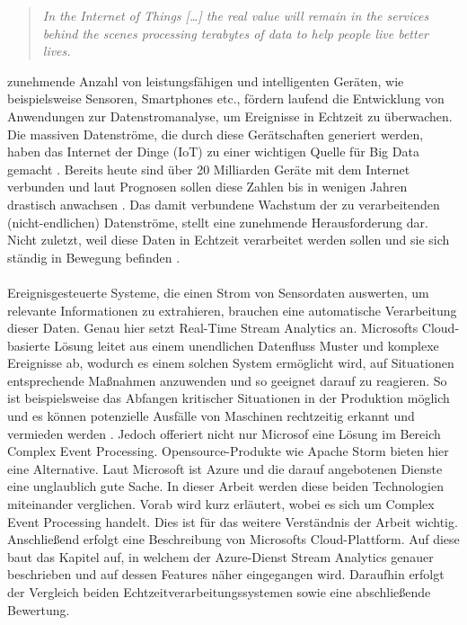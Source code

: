 
\begin{quote} \textit{\glqq In the Internet of Things […] the real value will remain in the services behind the scenes processing terabytes of data to help people live better lives. \grqq~}\cite{Floarea.2014}\\ \end{quote} 

 zunehmende Anzahl von leistungsfähigen und intelligenten Geräten, wie beispielsweise Sensoren, Smartphones etc., fördern laufend die Entwicklung von Anwendungen zur Datenstromanalyse, um Ereignisse in Echtzeit zu überwachen. Die massiven Datenströme, die durch diese Gerätschaften generiert werden, haben das Internet der Dinge (IoT) zu einer wichtigen Quelle für Big Data gemacht \cite{Prosise.}. Bereits heute sind über 20 Milliarden Geräte mit dem Internet verbunden und laut Prognosen sollen diese Zahlen bis in wenigen Jahren drastisch anwachsen \cite{Statista.2017}. Das damit verbundene Wachstum der zu verarbeitenden (nicht-endlichen) Datenströme, stellt eine zunehmende Herausforderung dar. Nicht zuletzt, weil diese Daten in Echtzeit verarbeitet werden sollen und sie sich ständig in Bewegung befinden \cite{Prosise.}.\\ \\ Ereignisgesteuerte Systeme, die einen Strom von Sensordaten auswerten, um relevante Informationen zu extrahieren, brauchen eine automatische Verarbeitung dieser Daten. Genau hier setzt Real-Time Stream Analytics an. Microsofts Cloud-basierte Lösung leitet aus einem unendlichen Datenfluss Muster und komplexe Ereignisse ab, wodurch es einem solchen System ermöglicht wird, auf Situationen entsprechende Maßnahmen anzuwenden und so geeignet darauf zu reagieren. So ist beispielsweise das Abfangen kritischer Situationen in der Produktion möglich und es können potenzielle Ausfälle von Maschinen rechtzeitig erkannt und vermieden werden \cite{rcrwireless.2016}. Jedoch offeriert nicht nur Microsof eine Lösung im Bereich Complex Event Processing. Opensource-Produkte wie Apache Storm bieten hier eine Alternative. Laut Microsoft ist Azure und die darauf angebotenen Dienste eine unglaublich gute Sache. In dieser Arbeit werden diese beiden Technologien miteinander verglichen. Vorab wird kurz erläutert, wobei es sich um Complex Event Processing handelt. Dies ist für das weitere Verständnis der Arbeit wichtig. Anschließend erfolgt eine Beschreibung von Microsofts Cloud-Plattform. Auf diese baut das Kapitel auf, in welchem der Azure-Dienst Stream Analytics genauer beschrieben und auf dessen Features näher eingegangen wird. Daraufhin erfolgt der Vergleich beiden Echtzeitverarbeitungssystemen sowie eine abschließende Bewertung. 